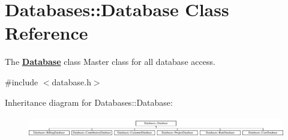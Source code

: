 \hypertarget{classDatabases_1_1Database}{\section{Databases\-:\-:Database Class Reference}
\label{classDatabases_1_1Database}
}


The {\bfseries \hyperlink{classDatabases_1_1Database}{Database}} class Master class for all database access.  




{\ttfamily \#include $<$database.\-h$>$}

Inheritance diagram for Databases\-:\-:Database\-:\begin{figure}[H]
\begin{center}
\leavevmode
\includegraphics[height=0.897436cm]{dd/db0/classDatabases_1_1Database}
\end{center}
\end{figure}
